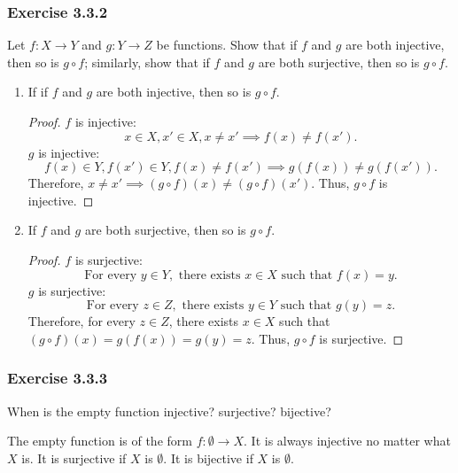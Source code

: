 \documentclass[12pt, letter]{article}
\begin{document}
\subsubsection*{Exercise 3.3.2}
Let $f:X\to Y$ and $g:Y\to Z$ be functions. Show that if $f$ and $g$ are both injective, then so is $g\circ f$; similarly, show that if $f$ and $g$ are both 
surjective, then so is $g\circ f$.
\begin{enumerate}
    \item If if $f$ and $g$ are both injective, then so is $g\circ f$.
    \begin{proof}
        $f$ is injective: 
        \begin{equation*}
            x\in X, x'\in X, x\ne x'\implies f(x)\ne f(x').
        \end{equation*}
        $g$ is injective:
        \begin{equation*}
            f(x)\in Y, f(x')\in Y, f(x)\ne f(x')\implies g(f(x))\ne g(f(x')).
        \end{equation*}
        Therefore, $x\ne x'\implies (g\circ f)(x)\ne (g\circ f)(x')$. Thus, $g\circ f$ is injective.
    \end{proof}
    \item If $f$ and $g$ are both surjective, then so is $g\circ f$.
    \begin{proof}
        $f$ is surjective:
        \begin{equation*}
            \text{For every }y\in Y, \text{ there exists }x\in X\text{ such that }f(x)=y.
        \end{equation*}
        $g$ is surjective:
        \begin{equation*}
            \text{For every }z\in Z, \text{ there exists }y\in Y\text{ such that }g(y)=z.
        \end{equation*}
        Therefore, for every $z\in Z$, there exists $x\in X$ such that $(g\circ f)(x)=g(f(x))=g(y)=z$. Thus, $g\circ f$ is surjective.
    \end{proof}
\end{enumerate}
\subsubsection*{Exercise 3.3.3}
When is the empty function injective? surjective? bijective?

The empty function is of the form $f:\emptyset\to X$. It is always injective no matter what $X$ is. It is surjective if $X$ is $\emptyset$. It is 
bijective if $X$ is $\emptyset$.
\end{document}
